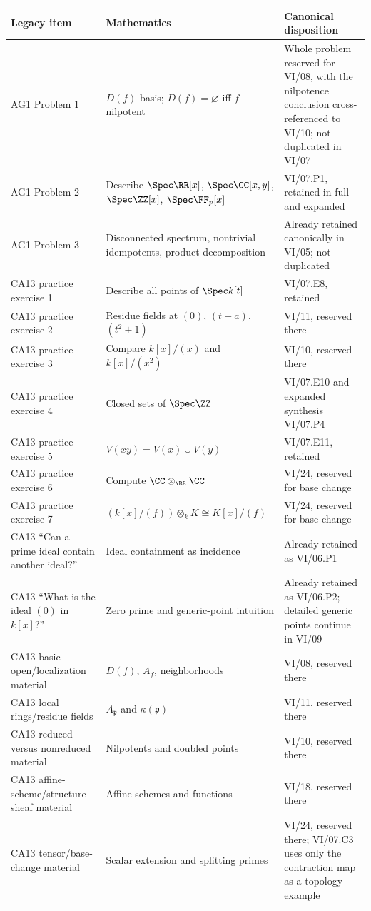 \begin{longtable}{>{\raggedright\arraybackslash}p{}>{\raggedright\arraybackslash}p{}>{\raggedright\arraybackslash}p{}}
\toprule
\textbf{Legacy item} & \textbf{Mathematics} & \textbf{Canonical disposition}\\
\midrule
AG1 Problem 1 & $D(f)$ basis; $D(f)=\varnothing$ iff $f$ nilpotent & Whole problem reserved for VI/08, with the nilpotence conclusion cross-referenced to VI/10; not duplicated in VI/07\\
AG1 Problem 2 & Describe $\Spec\RR[x]$, $\Spec\CC[x,y]$, $\Spec\ZZ[x]$, $\Spec\FF_p[x]$ & VI/07.P1, retained in full and expanded\\
AG1 Problem 3 & Disconnected spectrum, nontrivial idempotents, product decomposition & Already retained canonically in VI/05; not duplicated\\
CA13 practice exercise 1 & Describe all points of $\Spec k[t]$ & VI/07.E8, retained\\
CA13 practice exercise 2 & Residue fields at $(0)$, $(t-a)$, $(t^2+1)$ & VI/11, reserved there\\
CA13 practice exercise 3 & Compare $k[x]/(x)$ and $k[x]/(x^2)$ & VI/10, reserved there\\
CA13 practice exercise 4 & Closed sets of $\Spec\ZZ$ & VI/07.E10 and expanded synthesis VI/07.P4\\
CA13 practice exercise 5 & $V(xy)=V(x)\cup V(y)$ & VI/07.E11, retained\\
CA13 practice exercise 6 & Compute $\CC\otimes_{\RR}\CC$ & VI/24, reserved for base change\\
CA13 practice exercise 7 & $(k[x]/(f))\otimes_k K\cong K[x]/(f)$ & VI/24, reserved for base change\\
CA13 ``Can a prime ideal contain another ideal?'' & Ideal containment as incidence & Already retained as VI/06.P1\\
CA13 ``What is the ideal $(0)$ in $k[x]$?'' & Zero prime and generic-point intuition & Already retained as VI/06.P2; detailed generic points continue in VI/09\\
CA13 basic-open/localization material & $D(f)$, $A_f$, neighborhoods & VI/08, reserved there\\
CA13 local rings/residue fields & $A_{\mathfrak p}$ and $\kappa(\mathfrak p)$ & VI/11, reserved there\\
CA13 reduced versus nonreduced material & Nilpotents and doubled points & VI/10, reserved there\\
CA13 affine-scheme/structure-sheaf material & Affine schemes and functions & VI/18, reserved there\\
CA13 tensor/base-change material & Scalar extension and splitting primes & VI/24, reserved there; VI/07.C3 uses only the contraction map as a topology example\\
\bottomrule
\end{longtable}

